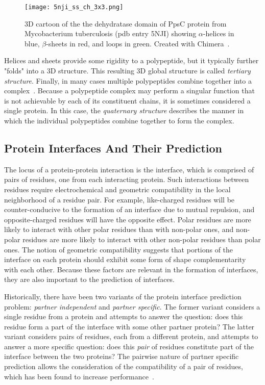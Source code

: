 \begin{figure}
	\centering
	\texttt{[image: 5nji\_ss\_ch\_3x3.png]}
	\caption{3D cartoon of the the dehydratase domain of PpsC protein from Mycobacterium tuberculosis (pdb entry 5NJI) showing $\alpha$-helices in blue, $\beta$-sheets in red, and loops in green. Created with Chimera~\cite{pettersen2004}.}
	\label{fig:5nji_ss}
\end{figure}

Helices and sheets provide some rigidity to a polypeptide, but it typically further "folds" into a 3D structure.
This resulting 3D global structure is called \textit{tertiary structure}.
Finally, in many cases multiple polypeptides combine together into a complex~\cite{scheeffink2003}.
Because a polypeptide complex may perform a singular function that is not achievable by each of its constituent chains, it is sometimes considered a single protein.
In this case, the \textit{quaternary structure} describes the manner in which the individual polypeptides combine together to form the complex. 


\subsection{Protein Interfaces And Their Prediction}


The locus of a protein-protein interaction is the interface, which is comprised of pairs of residues, one from each interacting protein.
Such interactions between residues require electrochemical and geometric compatibility in the local neighborhood of a residue pair.
For example, like-charged residues will be counter-conducive to the formation of an interface due to mutual repulsion, and opposite-charged residues will have the opposite effect.
Polar residues are more likely to interact with other polar residues than with non-polar ones, and non-polar residues are more likely to interact with other non-polar residues than polar ones.
The notion of geometric compatibility suggests that portions of the interface on each protein should exhibit some form of shape complementarity with each other. 
Because these factors are relevant in the formation of interfaces, they are also important to the prediction of interfaces.

Historically, there have been two variants of the protein interface prediction problem: \textit{partner independent} and \textit{partner specific}.
The former variant considers a single residue from a protein and attempts to answer the question: does this residue form a part of the interface with some other partner protein?
The latter variant considers pairs of residues, each from a different protein, and attempts to answer a more specific question: does this \textit{pair} of residues constitute part of the interface between the two proteins?
The pairwise nature of partner specific prediction allows the consideration of the compatibility of a pair of residues, which has been found to increase performance~\cite{ahmad2011}\cite{minhas2014}.

